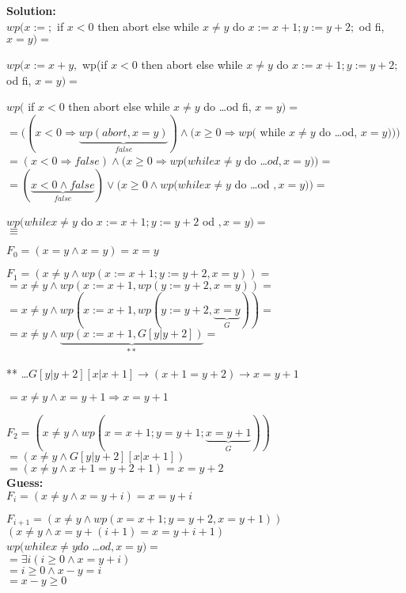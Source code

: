 \textbf{Solution:}\newline
\\

$wp(x:=;$ if $x < 0$ then abort else while $x \neq y$ do $x:= x+1; y:=y+2;$
  od fi, $x=y) =$

$wp(x:=x+y,$ wp(if $x<0$ then abort else while $x \neq y$ do 
  $x:=x+1; y:=y+2;$ od fi, $x=y) =$

$wp($ if $x<0$ then abort else while $x \neq y$ do \dots od fi, $x=y) =$ \\
$=(( x<0 \Rightarrow \underbrace{wp(abort, x = y)}_{false} ) \land (x \geq 0 \Rightarrow wp($
  while $x \neq y$ do \dots od, $x=y)))$\\
$=(x<0 \Rightarrow false) \land (x \geq0 \Rightarrow wp(while  x\neq y$ 
  do \dots $od, x=y)) = $\\
$=(\underbrace{x<0 \land false}_{false}) \lor (x\geq 0 \land 
  wp(while x \neq y$ do \dots od $, x=y)) =$

$wp(while x\neq y$ do $x:=x+1; y:=y+2$ od $, x=y) =$\\


$\equiv $

$F_0 = (x=y \land x=y) = x=y$

$F_1 = (x\neq y \land wp(x:=x+1; y:=y+2, x=y)) = $
$ = x\neq y \land wp(x:=x+1, wp(y:=y+2, x=y)) = $\\
$ = x\neq y \land wp(x:=x+1, wp(y:=y+2, \underbrace{x=y}_{G})) = $\\
$ = x\neq y \land \underbrace{wp(x:=x+1, G[y|y+2])}_{**} = $
\begin{flushright} %
    ** \dots $G[y|y+2][x|x+1] \rightarrow (x+1 = y+2) \rightarrow x = y+1$
\end{flushright}
\noindent $ = x\neq y \land x=y+1 \Rightarrow x=y+1$

$F_2 = (x\neq y \land wp(x=x+1; y=y+1; \underbrace{x=y+1}_{G}))$\\
$ = (x\neq y \land G[y|y+2][x|x+1])$\\
$ = (x\neq y \land x+1 = y+2+1) = x=y+2$\\

\textbf{Guess:}\\

$F_i = (x\neq y \land x=y+i) = x=y+i$

$F_{i+1} = (x\neq y \land wp(x=x+1; y=y+2, x=y+1))$\\
$(x\neq y \land x=y+(i+1) = x=y+i+1)$\\


$wp(while x\neq y do$ \dots $od, x=y) =$\\
$= \exists i(i\geq 0\land x=y+i)$\\
$= i\geq 0 \land x-y=i$\\
$= x-y\geq 0$\\

